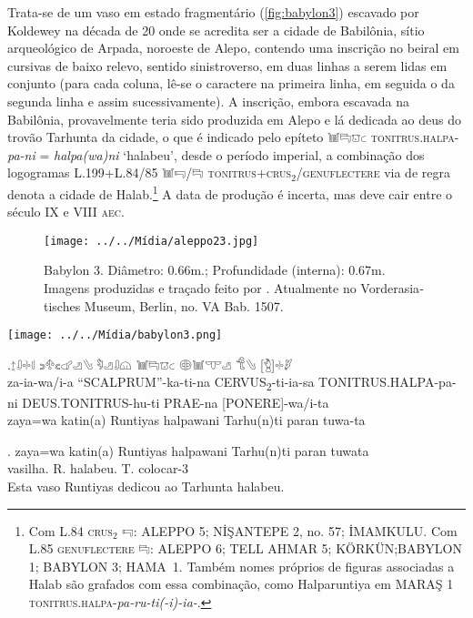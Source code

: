 Trata-se de um vaso em estado fragmentário (\autoref{fig:babylon3}) escavado por
Koldewey na década de 20 onde se acredita ser a cidade de Babilônia, sítio
arqueológico de Arpada, noroeste de Alepo, contendo uma inscrição no
beiral em cursivas de baixo relevo, sentido sinistroverso, em duas linhas a
serem lidas em conjunto (para cada coluna, lê-se o caractere na primeira linha,
em seguida o da segunda linha e assim sucessivamente).
A inscrição, embora escavada na Babilônia, provavelmente teria sido
produzida em Alepo e lá dedicada ao deus do trovão Tarhunta da cidade, o que é
indicado pelo epíteto 𔓢𔑞𔕸𔗐 \textsc{tonitrus.halpa}-\textit{pa-ni}
= \textit{halpa{(wa)}ni} `halabeu', desde o período imperial,
a combinação dos logogramas L.199+L.84\slash{}85 𔓢𔑝\slash{}𔑞
\textsc{tonitrus+crus$_2$\slash{}genuflectere} 
via de regra denota a cidade de Halab.\footnote{Com L.84
	\textsc{crus}$_2$ 𔑝: ALEPPO 5; NİŞANTEPE 2, no. 57; İMAMKULU.\@
	Com L.85 \textsc{genuflectere} 𔑞:  ALEPPO 6; TELL AHMAR 5;
	KÖRKÜN;\@ BABYLON 1; BABYLON 3; \mbox{HAMA 1}.\@
 Também nomes próprios de figuras associadas a Halab são grafados com essa
 combinação, como Halparuntiya em 
 MARAŞ 1 \textsc{tonitrus.halpa}-\textit{pa-ru-ti{(-i)}-ia-}.
}
A data de produção é incerta, mas deve cair entre o século IX e VIII
\textsc{aec}.

\begin{figure}[!htb]
	\texttt{[image: ../../Mídia/aleppo23.jpg]}
		\caption{
			Babylon 3. Diâmetro: 0.66m.; Profundidade 
			(interna): 0.67m. Imagens produzidas e traçado feito por 
			\textcite[\emph{plate} 212]{CHLI13}. Atualmente no 
			\foreignlanguage{german}{Vorderasiatisches Museum}, Berlin, 
			no. VA Bab. 1507.
		}\label{fig:babylon3}
\end{figure}

	\begin{center}
		\texttt{[image: ../../Mídia/babylon3.png]}
	\end{center}
\exg.{\Large 𔖪𔓱𔗬𔗷} {\Large 𔗎𔔯𔗏𔗧𔑣𔐤} {\Large 𔑵𔑣𔓱𔗔} {\Large 𔓢𔑞𔕸𔗐} {\Large 𔖖𔓢𔕙𔑣}
{\Large 𔐎𔐤} {\Large [𔑇]𔗬𔑯}\\
za-ia-wa/i-a\hspace{10pt} ``SCALPRUM''-ka-ti-na\hspace{10pt}
CERVUS\textsubscript{2}-ti-ia-sa\hspace{10pt} TONITRUS.HALPA-pa-ni\hspace{10pt}
DEUS.TONITRUS-hu-ti\hspace{10pt} PRAE-na\hspace{10pt} [PONERE]-wa/i-ta\\
zaya=wa katin{(a)} Runtiyas halpawani Tarhu{(n)}ti paran tuwa-ta

\exg. zaya=wa katin{(a)} Runtiyas halpawani Tarhu{(n)}ti paran tuwata\\
\Det{}\Acu{} vasilha.\Neut{}\Acu{} R.\Com{}\Nom{} halabeu.\Dat{} T.\Dat{} \Prep{} colocar-3\Sg\\
Esta vaso Runtiyas dedicou ao Tarhunta halabeu.


